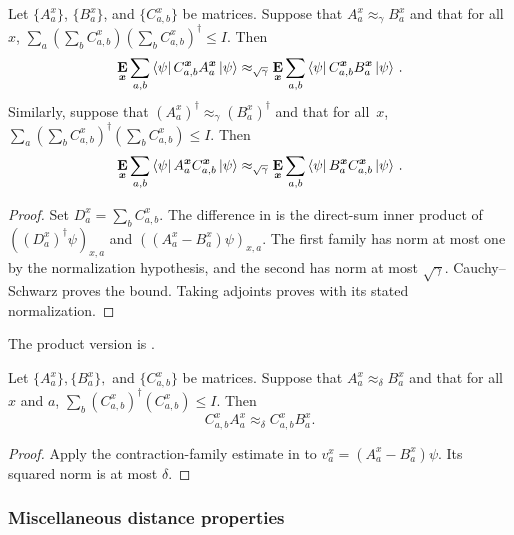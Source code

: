 \documentclass[11pt]{article}
\theoremstyle{definition}
\newcommand{\E}{\mathop{\bf E\/}}
\newcommand{\bx}{{\boldsymbol{x}}}
\begin{document}
\begin{proposition}
\label{prop:closeness-of-ip}
	Let $\{A^x_a\}$, $\{B^x_a\}$, and $\{C^x_{a,b} \}$ be matrices.
	Suppose that  $A^x_a \approx_\gamma B^x_a$ and that for all~$x$, $\sum_a (\sum_b C^x_{a,b}) (\sum_b C^x_{a,b})^\dagger  \leq I$. Then
	\begin{equation}
	\E_{\bx} \sum_{a,b} \bra{\psi} C^{\bx}_{a,b} A^{\bx}_a  \ket{\psi} \approx_{\sqrt{\gamma}} \E_{\bx} \sum_{a,b} \bra{\psi} C^{\bx}_{a,b} B^{\bx}_a  \ket{\psi} \,. \label{eq:closeness3}
	\end{equation}
	Similarly, suppose that  $(A^x_a)^\dagger \approx_\gamma (B^x_a)^\dagger$ and that for all~$x$, $\sum_a (\sum_b C^x_{a,b})^\dagger (\sum_b C^x_{a,b}) \leq I$. Then
	\begin{equation}
	\E_{\bx} \sum_{a,b} \bra{\psi} A^{\bx}_a  C^{\bx}_{a,b} \ket{\psi} \approx_{\sqrt{\gamma}} \E_{\bx} \sum_{a,b} \bra{\psi} B^{\bx}_a  C^{\bx}_{a,b}  \ket{\psi} \,. \label{eq:closeness4}
	\end{equation}
\end{proposition}
\begin{proof}
Set $D_a^x=\sum_b C_{a,b}^x$.  The difference in
 is the direct-sum inner product of
$((D_a^x)^\dagger\psi)_{x,a}$ and $((A_a^x-B_a^x)\psi)_{x,a}$.
The first family has norm at most one by the normalization
hypothesis, and the second has norm at most $\sqrt\gamma$.
Cauchy--Schwarz proves the bound.  Taking adjoints proves
 with its stated normalization.
\end{proof}

The product version is \cite[Fact~4.20]{NW19}.
    \begin{proposition}
      \label{prop:cab-approx-delta}
      Let $\{A^x_a\}, \{B^x_a\},$ and $\{C^x_{a,b}\}$ be
      matrices. Suppose that $A^{x}_a \approx_\delta B^{x}_a$ and that
      for all $x$ and $a$, $\sum_b (C^{x}_{a,b})^\dagger
      (C^{x}_{a,b}) \leq I$. Then
      \[ C^{x}_{a,b} A^x_{a} \approx_{\delta} C^{x}_{a,b} B^{x}_a. \]
    \end{proposition}
    \begin{proof}
Apply the contraction-family estimate in
 to $v_a^x=(A_a^x-B_a^x)\psi$.
Its squared norm is at most $\delta$.
\end{proof}

\subsubsection{Miscellaneous distance properties}
\end{document}
